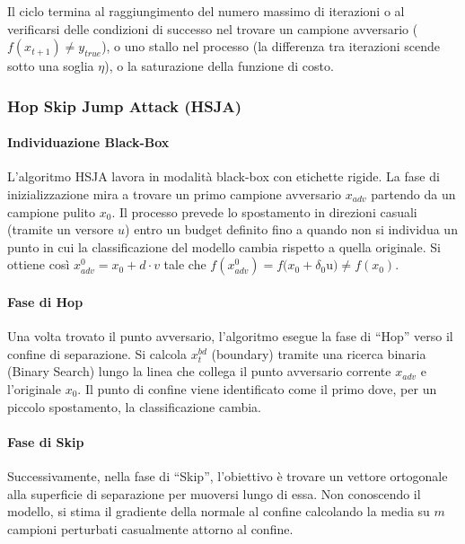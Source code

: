 Il ciclo termina al raggiungimento del numero massimo di
iterazioni o al verificarsi delle condizioni di successo nel
trovare un campione avversario ($f(x_{t+1}) \neq y_{true}$),
o uno stallo nel processo (la differenza tra iterazioni scende
sotto una soglia $\eta$), o la saturazione della funzione di
costo.

\subsubsection{Hop Skip Jump Attack (HSJA)}

\paragraph{Individuazione Black-Box}

L'algoritmo HSJA lavora in modalità black-box con etichette
rigide. La fase di inizializzazione mira a trovare un primo
campione avversario $x_{adv}$ partendo da un campione pulito
$x_0$. Il processo prevede lo spostamento in direzioni casuali
(tramite un versore $u$) entro un budget definito fino a quando
non si individua un punto in cui la classificazione del modello
cambia rispetto a quella originale. Si ottiene così
$x^0_{adv} = x_0 + d \cdot v$ tale che
$f(x^0_{adv}) = f(x_0 + \delta_0 $u$)\neq f(x_0)$.

\paragraph{Fase di Hop}

Una volta trovato il punto avversario, l'algoritmo esegue la
fase di ``Hop'' verso il confine di separazione. Si calcola
$x_t^{bd}$ (boundary) tramite una ricerca binaria (Binary
Search) lungo la linea che collega il punto avversario corrente
$x_{adv}$ e l'originale $x_0$. Il punto di confine viene
identificato come il primo dove, per un piccolo spostamento,
la classificazione cambia.

\paragraph{Fase di Skip}

Successivamente, nella fase di ``Skip'', l'obiettivo è trovare
un vettore ortogonale alla superficie di separazione per muoversi
lungo di essa. Non conoscendo il modello, si stima il gradiente
della normale al confine calcolando la media su $m$ campioni
perturbati casualmente attorno al confine.

